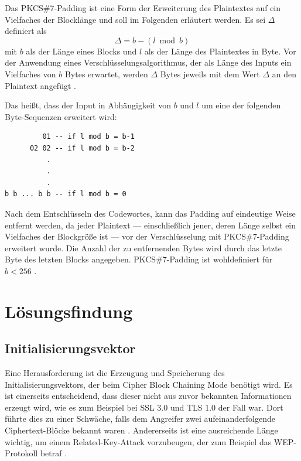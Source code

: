 \documentclass[course=erap]{aspdoc}
\begin{document}
Das PKCS\#7-Padding ist eine Form der Erweiterung des Plaintextes auf ein Vielfaches der Blocklänge und soll im Folgenden erläutert werden. Es sei $\Delta$ definiert als
\[
    \Delta = b - (l \bmod b)
\]
mit $b$ als der Länge eines Blocks und $l$ als der Länge des Plaintextes in Byte. Vor der Anwendung eines Verschlüsselungsalgorithmus, der als Länge des Inputs ein Vielfaches von $b$ Bytes erwartet, werden $\Delta$ Bytes jeweils mit dem Wert $\Delta$ an den Plaintext angefügt \cite[p.28]{rfc5652}.\bigbreak

Das heißt, dass der Input in Abhängigkeit von $b$ und $l$ um eine der folgenden Byte-Sequenzen erweitert wird:

\begin{samepage}
\begin{center}
\begin{varwidth}{\linewidth}
\begin{verbatim}
         01 -- if l mod b = b-1
      02 02 -- if l mod b = b-2
          .
          .
          .
b b ... b b -- if l mod b = 0
\end{verbatim}
\end{varwidth}
\end{center}
\end{samepage}

Nach dem Entschlüsseln des Codewortes, kann das Padding auf eindeutige Weise entfernt werden, da jeder Plaintext --- einschließlich jener, deren Länge selbst ein Vielfaches der Blockgröße ist --- vor der Verschlüsselung mit PKCS\#7-Padding erweitert wurde. Die Anzahl der zu entfernenden Bytes wird durch das letzte Byte des letzten Blocks angegeben. PKCS\#7-Padding ist wohldefiniert für $b < 256$ \cite[p.28]{rfc5652}.

\section{Lösungsfindung}

\subsection{Initialisierungsvektor}
\label{sec:Initialisierungsvektor}
Eine Herausforderung ist die Erzeugung und Speicherung des Initialisierungsvektors, der beim Cipher Block Chaining Mode benötigt wird. Es ist einerseits entscheidend, dass dieser nicht aus zuvor bekannten Informationen erzeugt wird, wie es zum Beispiel bei SSL 3.0 und TLS 1.0 der Fall war. Dort führte dies zu einer Schwäche, falls dem Angreifer zwei aufeinanderfolgende Ciphertext-Blöcke bekannt waren \cite{ssltls}. Andererseits ist eine ausreichende Länge wichtig, um einem Related-Key-Attack vorzubeugen, der zum Beispiel das WEP-Protokoll betraf \cite{wep}.\bigbreak
\end{document}

